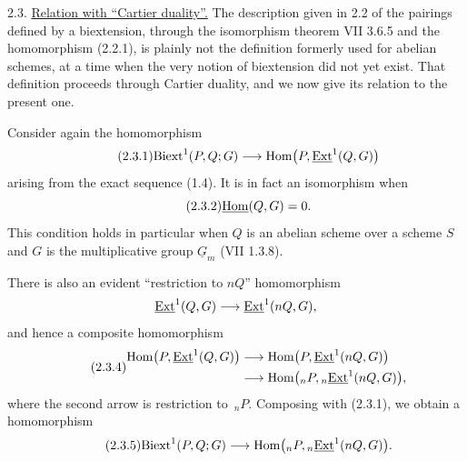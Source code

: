 
2.3. \underline{Relation with ``Cartier duality''.}
The description given in 2.2 of the pairings defined by a
biextension, through the isomorphism theorem VII 3.6.5 and the
homomorphism (2.2.1), is plainly not the definition formerly used for
abelian schemes, at a time when the very notion of biextension did not
yet exist.  That definition proceeds through Cartier duality, and we
now give its relation to the present one.

Consider again the homomorphism
\begin{equation}\tag{2.3.1}
 \mathrm{Biext}^1(P,Q;G)
 \longrightarrow
 \operatorname{Hom}\bigl(P,\uExt^1(Q,G)\bigr)
\end{equation}
arising from the exact sequence (1.4).  It is in fact an isomorphism
when
\begin{equation}\tag{2.3.2}
 \uHom(Q,G)=0.
\end{equation}
This condition holds in particular when $Q$ is an abelian scheme over
a scheme $S$ and $G$ is the multiplicative group $\underline G_m$
(VII 1.3.8).

There is also an evident ``restriction to $nQ$'' homomorphism
\[
 \uExt^1(Q,G)\longrightarrow\uExt^1(nQ,G),
\]
and hence a composite homomorphism
\begin{equation}\tag{2.3.4}
\begin{split}
 \operatorname{Hom}\bigl(P,\uExt^1(Q,G)\bigr)
 &\longrightarrow
 \operatorname{Hom}\bigl(P,\uExt^1(nQ,G)\bigr)\\
 &\longrightarrow
 \operatorname{Hom}\bigl({}_nP,{}_n\uExt^1(nQ,G)\bigr),
\end{split}
\end{equation}
where the second arrow is restriction to $\,{}_nP$.  Composing with
(2.3.1), we obtain a homomorphism
\begin{equation}\tag{2.3.5}
 \mathrm{Biext}^1(P,Q;G)
 \longrightarrow
 \operatorname{Hom}\bigl({}_nP,{}_n\uExt^1(nQ,G)\bigr).
\end{equation}

